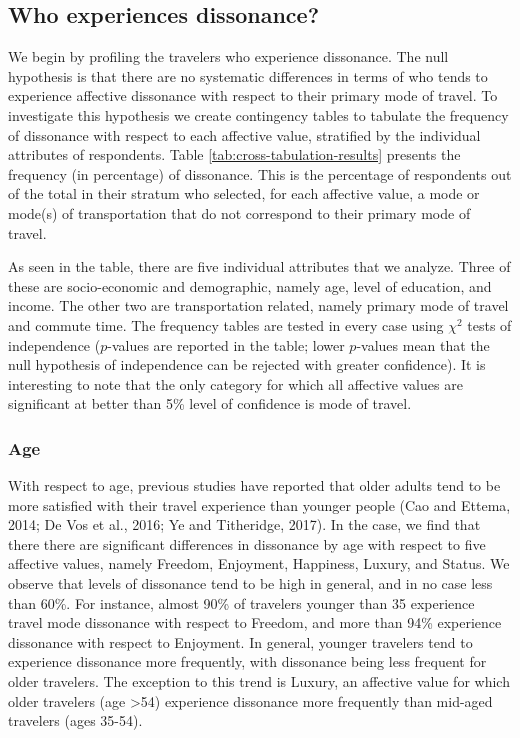 \documentclass[]{elsarticle} %
\begin{document}
\hypertarget{who-experiences-dissonance}{%
\subsection{Who experiences
dissonance?}\label{who-experiences-dissonance}}

We begin by profiling the travelers who experience dissonance. The null
hypothesis is that there are no systematic differences in terms of who
tends to experience affective dissonance with respect to their primary
mode of travel. To investigate this hypothesis we create contingency
tables to tabulate the frequency of dissonance with respect to each
affective value, stratified by the individual attributes of respondents.
Table \ref{tab:cross-tabulation-results} presents the frequency (in
percentage) of dissonance. This is the percentage of respondents out of
the total in their stratum who selected, for each affective value, a
mode or mode(s) of transportation that do not correspond to their
primary mode of travel.

As seen in the table, there are five individual attributes that we
analyze. Three of these are socio-economic and demographic, namely age,
level of education, and income. The other two are transportation
related, namely primary mode of travel and commute time. The frequency
tables are tested in every case using \(\chi^2\) tests of independence
(\(p\)-values are reported in the table; lower \(p\)-values mean that
the null hypothesis of independence can be rejected with greater
confidence). It is interesting to note that the only category for which
all affective values are significant at better than 5\% level of
confidence is mode of travel.

\hypertarget{age}{%
\subsubsection{Age}\label{age}}

With respect to age, previous studies have reported that older adults
tend to be more satisfied with their travel experience than younger
people (Cao and Ettema, 2014; De Vos et al., 2016; Ye and Titheridge,
2017). In the case, we find that there there are significant differences
in dissonance by age with respect to five affective values, namely
Freedom, Enjoyment, Happiness, Luxury, and Status. We observe that
levels of dissonance tend to be high in general, and in no case less
than 60\%. For instance, almost 90\% of travelers younger than 35
experience travel mode dissonance with respect to Freedom, and more than
94\% experience dissonance with respect to Enjoyment. In general,
younger travelers tend to experience dissonance more frequently, with
dissonance being less frequent for older travelers. The exception to
this trend is Luxury, an affective value for which older travelers (age
\textgreater54) experience dissonance more frequently than mid-aged
travelers (ages 35-54).
\end{document}
